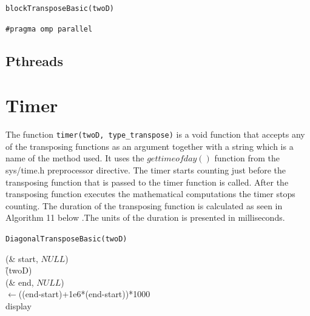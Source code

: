 \documentclass[conference]{IEEEtran}
\begin{document}
\begin{algorithm}





\caption{\texttt{blockTransposeBasic(twoD)}}
\texttt{\#pragma omp parallel}\\
\label{blo}
\end{algorithm}

\subsection{Pthreads}

\section{Timer}
The function \texttt{timer(twoD, type\_transpose)} is a void function that accepts any of the transposing functions as an argument together with a string which is a name of the method used. It uses the \texttt{$gettimeofday()$} function from the sys/time.h preprocessor directive. The timer starts counting just before the transposing function that is passed to the timer function is called. After the transposing function executes the mathematical computations the timer stops counting. The duration of the transposing function is calculated as seen in Algorithm 11 below .The units of the duration is presented in milliseconds.

\begin{algorithm}




\caption{\texttt{DiagonalTransposeBasic(twoD)}}
\gettimeofday(\& start, $NULL$)\\
\f(twoD)\\
\gettimeofday(\& end, $NULL$)\\
\duration$\leftarrow$((end-start)+1e6*(end-start))*1000\\
display \duration

\label{b}
\end{algorithm}
\end{document}

